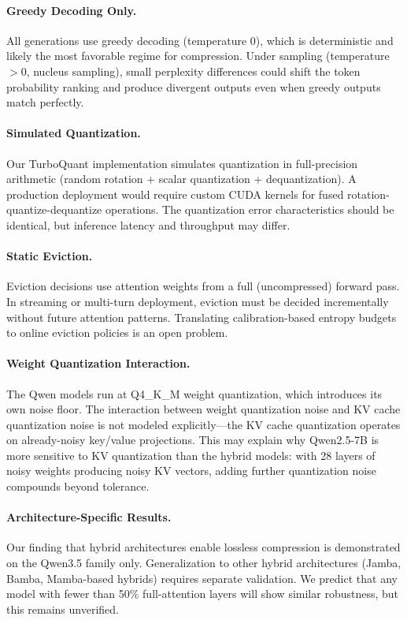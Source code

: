 \documentclass[11pt]{article}
\begin{document}
\paragraph{Greedy Decoding Only.}
All generations use greedy decoding (temperature 0), which is deterministic and likely the most favorable regime for compression.  Under sampling (temperature $> 0$, nucleus sampling), small perplexity differences could shift the token probability ranking and produce divergent outputs even when greedy outputs match perfectly.

\paragraph{Simulated Quantization.}
Our TurboQuant implementation simulates quantization in full-precision arithmetic (random rotation + scalar quantization + dequantization).  A production deployment would require custom CUDA kernels for fused rotation-quantize-dequantize operations.  The quantization error characteristics should be identical, but inference latency and throughput may differ.

\paragraph{Static Eviction.}
Eviction decisions use attention weights from a full (uncompressed) forward pass.  In streaming or multi-turn deployment, eviction must be decided incrementally without future attention patterns.  Translating calibration-based entropy budgets to online eviction policies is an open problem.

\paragraph{Weight Quantization Interaction.}
The Qwen models run at Q4\_K\_M weight quantization, which introduces its own noise floor.  The interaction between weight quantization noise and KV cache quantization noise is not modeled explicitly---the KV cache quantization operates on already-noisy key/value projections.  This may explain why Qwen2.5-7B is more sensitive to KV quantization than the hybrid models: with 28 layers of noisy weights producing noisy KV vectors, adding further quantization noise compounds beyond tolerance.

\paragraph{Architecture-Specific Results.}
Our finding that hybrid architectures enable lossless compression is demonstrated on the Qwen3.5 family only.  Generalization to other hybrid architectures (Jamba, Bamba, Mamba-based hybrids) requires separate validation.  We predict that any model with fewer than 50\% full-attention layers will show similar robustness, but this remains unverified.
\end{document}
